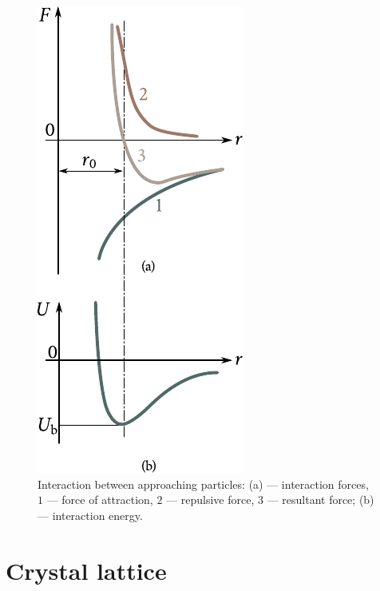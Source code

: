 \begin{figure}[t]
	\begin{center}
		\includegraphics[scale=0.95]{figures/ch_01/fig_1_10.pdf}
		\caption[]{Interaction between approaching particles: (a) --- interaction forces, $1$ --- force of attraction, $2$ --- repulsive force, $3$ --- resultant force; (b) --- interaction energy.}
		\label{fig:1_10}
	\end{center}
	\vspace{-0.7cm}
\end{figure}

\section{Crystal lattice}\label{sec:1_8}


